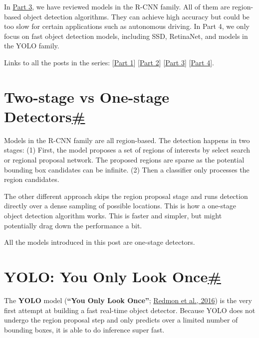 In \href{https://lilianweng.github.io/posts/2017-12-31-object-recognition-part-3/}{Part 3}, we have reviewed models in the R-CNN family. All of them are region-based object detection algorithms. They can achieve high accuracy but could be too slow for certain applications such as autonomous driving. In Part 4, we only focus on fast object detection models, including SSD, RetinaNet, and models in the YOLO family.

Links to all the posts in the series: {[}\href{https://lilianweng.github.io/posts/2017-10-29-object-recognition-part-1/}{Part 1}{]} {[}\href{https://lilianweng.github.io/posts/2017-12-15-object-recognition-part-2/}{Part 2}{]} {[}\href{https://lilianweng.github.io/posts/2017-12-31-object-recognition-part-3/}{Part 3}{]} {[}\href{https://lilianweng.github.io/posts/2018-12-27-object-recognition-part-4/}{Part 4}{]}.

\section{\texorpdfstring{Two-stage vs One-stage Detectors\hyperref[two-stage-vs-one-stage-detectors]{\#}}{Two-stage vs One-stage Detectors\#}}\label{two-stage-vs-one-stage-detectors}

Models in the R-CNN family are all region-based. The detection happens in two stages: (1) First, the model proposes a set of regions of interests by select search or regional proposal network. The proposed regions are sparse as the potential bounding box candidates can be infinite. (2) Then a classifier only processes the region candidates.

The other different approach skips the region proposal stage and runs detection directly over a dense sampling of possible locations. This is how a one-stage object detection algorithm works. This is faster and simpler, but might potentially drag down the performance a bit.

All the models introduced in this post are one-stage detectors.

\section{\texorpdfstring{YOLO: You Only Look Once\hyperref[yolo-you-only-look-once]{\#}}{YOLO: You Only Look Once\#}}\label{yolo-you-only-look-once}

The \textbf{YOLO} model (\textbf{``You Only Look Once''}; \href{https://www.cv-foundation.org/openaccess/content_cvpr_2016/papers/Redmon_You_Only_Look_CVPR_2016_paper.pdf}{Redmon et al., 2016}) is the very first attempt at building a fast real-time object detector. Because YOLO does not undergo the region proposal step and only predicts over a limited number of bounding boxes, it is able to do inference super fast.

